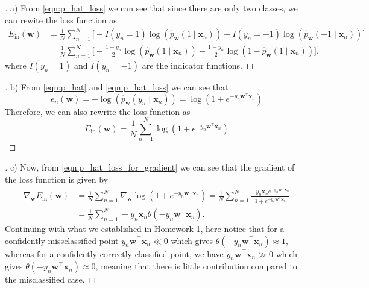 \documentclass{article}
\begin{document}
    \begin{proof}[\unskip\nopunct]
        a) From \eqref{eqn:p_hat_loss} we can see that since there 
        are only two classes, we can rewite the loss function as
        \begin{align}
            E_{\text{in}}(\mathbf{w}) &=
            \frac{1}{N}\sum_{n=1}^N \big[-I(y_n=1)\log(\hat{p}
            _\mathbf{w}(1\mid \mathbf{x}_n)) -I(y_n=-1)\log(\hat{p}
            _\mathbf{w}(-1\mid \mathbf{x}_n))\big]\nonumber\\
            \label{eqn:p_hat_loss_for_gradient_matrix_form}
            &=\frac{1}{N}\sum_{n=1}^N \Big[-\frac{1+y_n}{2}\log
            (\hat{p}_\mathbf{w}(1\mid \mathbf{x}_n)) -\frac{1-y_n}
            {2}\log(1-\hat{p}_\mathbf{w}(1\mid \mathbf{x}_n))\Big],
        \end{align}
        where $I(y_n=1)$ and $I(y_n=-1)$ are the indicator 
        functions.
    \end{proof}

    \begin{proof}[\unskip\nopunct]
        b) From \eqref{eqn:p_hat} and \eqref{eqn:p_hat_loss} we 
        can see that 
        \[
            e_n(\mathbf{w}) = -\log\left(\hat{p}_\mathbf{w}(y_n 
            \mid \mathbf{x}_n)\right) = \log(1+e^{-y_n\mathbf{w}^
            \top\mathbf{x}_n})    
        \]
        Therefore, we can also rewrite the loss function as
        \begin{equation}
            \label{eqn:p_hat_loss_for_gradient}
            E_{\text{in}}(\mathbf{w}) = \frac{1}{N}\sum_{n=1}^N
            \log(1+e^{-y_n\mathbf{w}^\top\mathbf{x}_n})
        \end{equation}
    \end{proof}

    \begin{proof}[\unskip\nopunct]
        c) Now, from \eqref{eqn:p_hat_loss_for_gradient} we can see
        that the gradient of the loss function is given by
        \begin{align}
            \nabla_{\mathbf{w}}E_{\text{in}}(\mathbf{w}) &= 
            \frac{1}{N}\sum_{n=1}^N\nabla_\mathbf{w}\log(1+e^
            {-y_n\mathbf{w}^\top\mathbf{x}_n}) = 
            \frac{1}{N}\sum_{n=1}^N\frac{-y_n\mathbf{x}_n
            e^{-y_n\mathbf{w}^\top\mathbf{x}_n}}{1+e^{-y_n 
            \mathbf{w}^\top\mathbf{x}_n}}\nonumber\\
            &=\frac{1}{N}\sum_{n=1}^N -y_n\mathbf{x}_n\theta(-y_n
            \mathbf{w}^\top\mathbf{x}_n).
        \end{align}
        Continuing with what we established in Homework 1, here 
        notice that for a confidently missclassified point  
        $y_n\mathbf{w}^\top\mathbf{x}_n\ll0$ which gives 
        $\theta(-y_n\mathbf{w}^\top\mathbf{x}_n) \approx 1$,
        whereas for a confidently correctly classified point, we 
        have $y_n\mathbf{w}^\top\mathbf{x}_n\gg 0$ which gives 
        $\theta(-y_n\mathbf{w}^\top\mathbf{x}_n) \approx 0$, 
        meaning that there is little contribution compared to the
        misclassified case.
    \end{proof}
\end{document}
